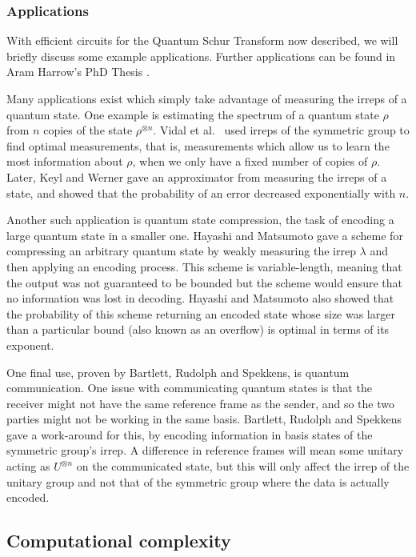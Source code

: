\subsubsection{Applications}

With efficient circuits for the Quantum Schur Transform now described, we will briefly discuss some example applications. Further applications can be found in Aram Harrow's PhD Thesis \cite{harrow2005}.

Many applications exist which simply take advantage of measuring the irreps of a quantum state. One example is estimating the spectrum of a quantum state $\rho$ from $n$ copies of the state $\rho^{\otimes n}$. Vidal et al.~\cite{vidal1999} used irreps of the symmetric group to find optimal measurements, that is, measurements which allow us to learn the most information about $\rho$, when we only have a fixed number of copies of $\rho$. Later, Keyl and Werner \cite{keyl2001} gave an approximator from measuring the irreps of a state, and showed that the probability of an error decreased exponentially with $n$.

Another such application is quantum state compression, the task of encoding a large quantum state in a smaller one. Hayashi and Matsumoto \cite{hayashi2002, hayashi2002simple} gave a scheme for compressing an arbitrary quantum state by weakly measuring the irrep $\lambda$ and then applying an encoding process. This scheme is variable-length, meaning that the output was not guaranteed to be bounded but the scheme would ensure that no information was lost in decoding. Hayashi and Matsumoto also showed that the probability of this scheme returning an encoded state whose size was larger than a particular bound (also known as an overflow) is optimal in terms of its exponent.

One final use, proven by Bartlett, Rudolph and Spekkens\cite{bartlett2001}, is quantum communication. One issue with communicating quantum states is that the receiver might not have the same reference frame as the sender, and so the two parties might not be working in the same basis. Bartlett, Rudolph and Spekkens gave a work-around for this, by encoding information in basis states of the symmetric group's irrep. A difference in reference frames will mean some unitary acting as $U^{\otimes n}$ on the communicated state, but this will only affect the irrep of the unitary group and not that of the symmetric group where the data is actually encoded.

\subsection{Computational complexity}
\label{ssec:schur-simulation}

